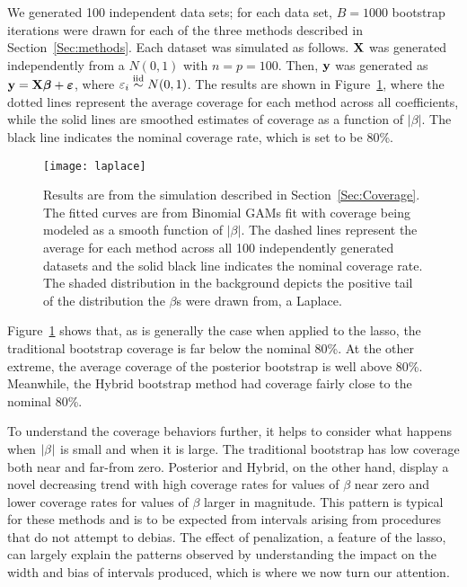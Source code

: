 We generated 100 independent data sets; for each data set, $B = 1000$ bootstrap iterations were drawn for each of the three methods described in Section~\ref{Sec:methods}. Each dataset was simulated as follows. $\mathbf{X}$ was generated independently from a $N(0, 1)$ with $n = p = 100$. Then, $\mathbf{y}$ was generated as $\mathbf{y} = \mathbf{X}\boldsymbol{\beta} + \boldsymbol{\varepsilon}$, where $\varepsilon_i \overset{\text{iid}}{\sim} N(0, 1)$. The results are shown in Figure~\ref{Fig:laplace}, where the dotted lines represent the average coverage for each method across all coefficients, while the solid lines are smoothed estimates of coverage as a function of $|\beta|$. The black line indicates the nominal coverage rate, which is set to be 80\%.

\begin{figure}[hbtp]
  \begin{center}
  \texttt{[image: laplace]}
  \caption{\label{Fig:laplace} Results are from the simulation described in Section~\ref{Sec:Coverage}. The fitted curves are from Binomial GAMs fit with coverage being modeled as a smooth function of $|\beta|$. The dashed lines represent the average for each method across all 100 independently generated datasets and the solid black line indicates the nominal coverage rate. The shaded distribution in the background depicts the positive tail of the distribution the $\beta$s were drawn from, a Laplace.}
  \end{center}
\end{figure}

Figure~\ref{Fig:laplace} shows that, as is generally the case when applied to the lasso, the traditional bootstrap coverage is far below the nominal 80\%. At the other extreme, the average coverage of the posterior bootstrap is well above 80\%. Meanwhile, the Hybrid bootstrap method had coverage fairly close to the nominal 80\%.

To understand the coverage behaviors further, it helps to consider what happens when $\left\lvert\beta\right\rvert$ is small and when it is large. The traditional bootstrap has low coverage both near and far-from zero. Posterior and Hybrid, on the other hand, display a novel decreasing trend with high coverage rates for values of $\beta$ near zero and lower coverage rates for values of $\beta$ larger in magnitude. This pattern is typical for these methods and is to be expected from intervals arising from procedures that do not attempt to debias. The effect of penalization, a feature of the lasso, can largely explain the patterns observed by understanding the impact on the width and bias of intervals produced, which is where we now turn our attention.

